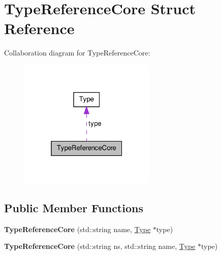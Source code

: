 \hypertarget{struct_type_reference_core}{\section{Type\-Reference\-Core Struct Reference}
\label{struct_type_reference_core}
}


Collaboration diagram for Type\-Reference\-Core\-:
\nopagebreak
\begin{figure}[H]
\begin{center}
\leavevmode
\includegraphics[width=184pt]{struct_type_reference_core__coll__graph}
\end{center}
\end{figure}
\subsection*{Public Member Functions}
\begin{DoxyCompactItemize}
\item 
\hypertarget{struct_type_reference_core_a804395c092ac4c702bf02674e077cbe8}{{\bfseries Type\-Reference\-Core} (std\-::string name, \hyperlink{class_type}{Type} $\ast$type)}\label{struct_type_reference_core_a804395c092ac4c702bf02674e077cbe8}

\item 
\hypertarget{struct_type_reference_core_ae28c40804c0662549c8618fcb42dc87f}{{\bfseries Type\-Reference\-Core} (std\-::string ns, std\-::string name, \hyperlink{class_type}{Type} $\ast$type)}\label{struct_type_reference_core_ae28c40804c0662549c8618fcb42dc87f}

\end{DoxyCompactItemize}
